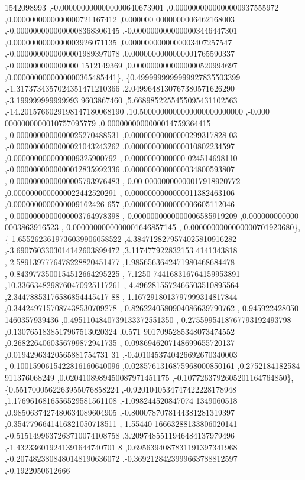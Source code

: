 \begin{DoxyCode}
      1542098993 ,-0.0000000000000000640673901 ,0.0000000000000000937555972 ,0.0000000000000000721167412 ,0.000000
      0000000006462168003 ,-0.0000000000000008368306145 ,-0.0000000000000003446447301 ,0.0000000000000003926071135
       ,0.0000000000000003407257547 ,-0.0000000000000001989397078 ,0.0000000000000001765590337 ,-0.000000000000000
      1512149369 ,0.0000000000000000520994697 ,0.0000000000000000365485441\},
\{0.4999999999999927835503399 ,-1.3173734357024351471210366 ,2.0499648130767380571626290 ,-3.199999999999993
      9603867460 ,5.6689852255455095431102563 ,-14.2015766029198147180068190 ,10.5000000000000000000000000 ,-0.000
      0000000000010757095779 ,0.0000000000000014759364415 ,-0.0000000000000025270488531 ,0.00000000000000299317828
      03 ,-0.0000000000000021043243262 ,0.0000000000000010802234597 ,0.0000000000000009325900792 ,-0.0000000000000
      024514698110 ,-0.0000000000000012835992336 ,0.0000000000000034800593807 ,-0.0000000000000005793976483 ,-0.00
      00000000000017918920772 ,0.0000000000000022442520291 ,-0.0000000000000011382463106 ,0.0000000000000009162426
      657 ,0.0000000000000006605112046 ,-0.0000000000000003764978398 ,-0.0000000000000006585919209 ,0.000000000000
      0003863916523 ,-0.0000000000000001646857145 ,-0.0000000000000000701923680\},
\{-1.6552623619736039906058522 ,4.3847128279574025810916282 ,-3.6907603303014142603899472 ,3.117477922832153
      4141343818 ,-2.5891397776478228820451477 ,1.9856563642471980468684478 ,-0.8439773500154512664295225 ,-7.1250
      744168316764159953891 ,10.3366348298760470925117261 ,-4.4962815572466503510895564 ,2.34478853176586854445417
      88 ,-1.1672918013797999314817844 ,0.3442497157087438530709278 ,-0.8262240580904086639790762 ,-0.945922428050
      1460357939436 ,0.4951104840739133372551350 ,-0.2755995418767793192493798 ,0.1307651838517967513020324 ,0.571
      9017095285348073474552 ,0.2682264060356799872941735 ,-0.0986946207148699655720137 ,0.01942963420565881754731
      31 ,-0.4010453740426692670340003 ,-0.1001590615422816160640096 ,0.0285761316875968000850161 ,0.2752184182584
      911376068249 ,0.0204108989450087971451175 ,-0.1077263792605201164764850\},
\{0.5517000562263955076858224 ,-0.9201040534747422228178948 ,1.1769616816556529581561108 ,-1.098244520847074
      1349060518 ,0.9850637427480634089604905 ,-0.8000787078144381281319397 ,0.3547796641416821050718511 ,-1.55440
      16663288133806020141 ,-0.5151499637263710074108758 ,3.2097485511946484137979496 ,-1.432336019241391644740701
      8 ,0.6956394087831191397341968 ,-0.2074823808480148190636072 ,-0.3692128423999663788812597 ,-0.1922050612666

\end{DoxyCode}
